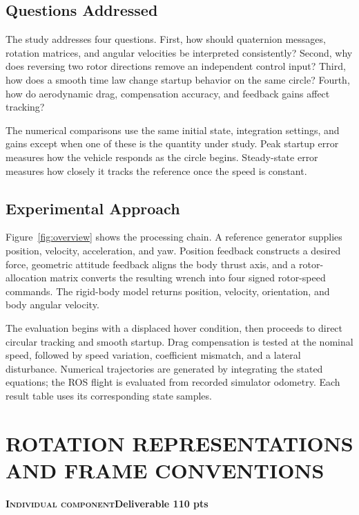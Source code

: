\documentclass[letterpaper,10pt,conference]{ieeeconf}
\newcommand{\deliverablebar}[3]{%
  \vspace{-0.35em}\noindent
  \colorbox{softblue}{\parbox{\dimexpr\columnwidth-2\fboxsep\relax}{%
    \scriptsize\color{navy}\bfseries\textsc{#1}\hfill #2\hfill #3}}%
  \par\vspace{0.45em}}
\begin{document}
\subsection{Questions Addressed}
The study addresses four questions. First, how should quaternion messages, rotation matrices, and angular velocities be interpreted consistently? Second, why does reversing two rotor directions remove an independent control input? Third, how does a smooth time law change startup behavior on the same circle? Fourth, how do aerodynamic drag, compensation accuracy, and feedback gains affect tracking?

The numerical comparisons use the same initial state, integration settings, and gains except when one of these is the quantity under study. Peak startup error measures how the vehicle responds as the circle begins. Steady-state error measures how closely it tracks the reference once the speed is constant.

\subsection{Experimental Approach}
Figure~\ref{fig:overview} shows the processing chain. A reference generator supplies position, velocity, acceleration, and yaw. Position feedback constructs a desired force, geometric attitude feedback aligns the body thrust axis, and a rotor-allocation matrix converts the resulting wrench into four signed rotor-speed commands. The rigid-body model returns position, velocity, orientation, and body angular velocity.

The evaluation begins with a displaced hover condition, then proceeds to direct circular tracking and smooth startup. Drag compensation is tested at the nominal speed, followed by speed variation, coefficient mismatch, and a lateral disturbance. Numerical trajectories are generated by integrating the stated equations; the ROS flight is evaluated from recorded simulator odometry. Each result table uses its corresponding state samples.

\section{ROTATION REPRESENTATIONS AND FRAME CONVENTIONS}
\deliverablebar{Individual component}{Deliverable 1}{10 pts}
\end{document}
